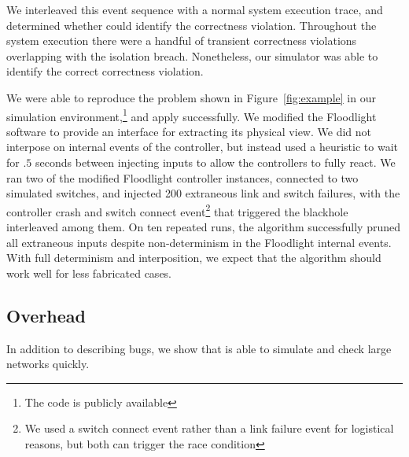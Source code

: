 {We interleaved this event sequence with a normal system execution trace, and
determined whether \simulator{} could identify the correctness violation.
Throughout the system execution there were a handful of transient
correctness violations overlapping with the isolation breach. Nonetheless, our
simulator was able to identify the correct correctness violation.

We were able to reproduce the problem shown in Figure~\ref{fig:example} in our
simulation environment,\footnote{The code is publicly available}
and apply \simulator{} successfully.
We modified the Floodlight software to provide an interface for extracting its
physical view. We did not interpose on internal events of the controller, but instead used a
heuristic to wait for $.5$ seconds between injecting inputs to allow the
controllers to fully react. We ran two of the modified Floodlight controller
instances, connected to two simulated switches, and injected 200 extraneous link
and switch failures, with the controller crash and switch connect event\footnote{We used a switch connect
event rather than a link failure event for logistical reasons, but both
can trigger the race condition} that triggered the blackhole interleaved among them.
On ten repeated runs, the algorithm successfully pruned all extraneous
inputs despite non-determinism in the Floodlight internal events. With full determinism and
interposition, we expect that the algorithm should work well for less
fabricated cases.

\subsection{Overhead}


In addition to describing bugs, we show that \projectname{} is able
to simulate and check large networks quickly.

}
